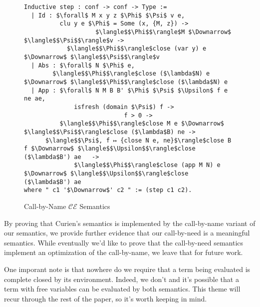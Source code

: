 \begin{figure}
\begin{lstlisting}
Inductive step : conf -> conf -> Type :=
  | Id : $\forall$ M x y z $\Phi$ $\Psi$ v e, 
          clu y e $\Phi$ = Some (x, {M, z}) -> 
                    $\langle$$\Phi$$\rangle$M $\Downarrow$ $\langle$$\Psi$$\rangle$v ->
            $\langle$$\Phi$$\rangle$close (var y) e $\Downarrow$ $\langle$$\Psi$$\rangle$v
  | Abs : $\forall$ N $\Phi$ e, 
        $\langle$$\Phi$$\rangle$close ($\lambda$N) e $\Downarrow$ $\langle$$\Phi$$\rangle$close ($\lambda$N) e
  | App : $\forall$ N M B B' $\Phi$ $\Psi$ $\Upsilon$ f e ne ae, 
              isfresh (domain $\Psi$) f -> 
                            f > 0 ->
          $\langle$$\Phi$$\rangle$close M e $\Downarrow$ $\langle$$\Psi$$\rangle$close ($\lambda$B) ne -> 
      $\langle$$\Psi$, f ↦ {close N e, ne}$\rangle$close B f $\Downarrow$ $\langle$$\Upsilon$$\rangle$close ($\lambda$B') ae   ->
              $\langle$$\Phi$$\rangle$close (app M N) e $\Downarrow$ $\langle$$\Upsilon$$\rangle$close ($\lambda$B') ae
where " c1 '$\Downarrow$' c2 " := (step c1 c2).
\end{lstlisting}
\caption{Call-by-Name $\mathcal{CE}$ Semantics}
\label{fig:bigstepname}
\end{figure}

By proving that Curien's semantics is implemented by the call-by-name variant of
our semantics, we provide further evidence that our call-by-need is a
meaningful semantics. While eventually we'd like to prove that the call-by-need
semantics implement an optimization of the call-by-name, we leave that for
future work.

One imporant note is that nowhere do we require that a term being evaluated is
complete closed by its environment. Indeed, we don't and it's possible that a
term with free variables can be evaluated by both semantics. This theme will
recur through the rest of the paper, so it's worth keeping in mind.  
